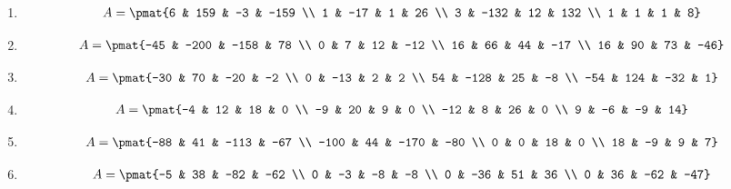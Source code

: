 \begin{enumerate}
\item

\begin{align*}
A = \pmat{6 & 159 & -3 & -159 \\ 1 & -17 & 1 & 26 \\ 3 & -132 & 12 & 132 \\ 1 & 1 & 1 & 8}
\end{align*}

\item

\begin{align*}
A = \pmat{-45 & -200 & -158 & 78 \\ 0 & 7 & 12 & -12 \\ 16 & 66 & 44 & -17 \\ 16 & 90 & 73 & -46}
\end{align*}

\item

\begin{align*}
A = \pmat{-30 & 70 & -20 & -2 \\ 0 & -13 & 2 & 2 \\ 54 & -128 & 25 & -8 \\ -54 & 124 & -32 & 1}
\end{align*}

\item

\begin{align*}
A = \pmat{-4 & 12 & 18 & 0 \\ -9 & 20 & 9 & 0 \\ -12 & 8 & 26 & 0 \\ 9 & -6 & -9 & 14}
\end{align*}

\item

\begin{align*}
A = \pmat{-88 & 41 & -113 & -67 \\ -100 & 44 & -170 & -80 \\ 0 & 0 & 18 & 0 \\ 18 & -9 & 9 & 7}
\end{align*}

\item

\begin{align*}
A = \pmat{-5 & 38 & -82 & -62 \\ 0 & -3 & -8 & -8 \\ 0 & -36 & 51 & 36 \\ 0 & 36 & -62 & -47}
\end{align*}


\end{enumerate}
